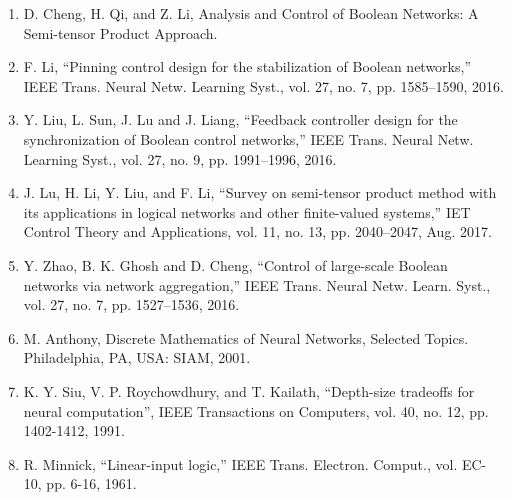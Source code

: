 \documentclass{article}
\begin{document}
\begin{enumerate}
	\item D. Cheng, H. Qi, and Z. Li, Analysis and Control of Boolean Networks: A Semi-tensor Product Approach.

	\item F. Li, “Pinning control design for the stabilization of Boolean networks,” IEEE Trans. Neural Netw. Learning Syst., vol. 27, no. 7, pp. 1585–1590, 2016.

	\item Y. Liu, L. Sun, J. Lu and J. Liang, “Feedback controller design for the synchronization of Boolean control networks,” IEEE Trans. Neural Netw. Learning Syst., vol. 27, no. 9, pp. 1991–1996, 2016.

	\item J. Lu, H. Li, Y. Liu, and F. Li, “Survey on semi-tensor product method with its applications
	in logical networks and other finite-valued systems,” IET Control Theory and Applications, vol.
	11, no. 13, pp. 2040–2047, Aug. 2017.

	\item Y. Zhao, B. K. Ghosh and D. Cheng, “Control of large-scale Boolean networks via network
	aggregation,” IEEE Trans. Neural Netw. Learn. Syst., vol. 27, no. 7, pp. 1527–1536, 2016.

	\item M. Anthony, Discrete Mathematics of Neural Networks, Selected Topics. Philadelphia, PA,
	USA: SIAM, 2001.

	\item K. Y. Siu, V. P. Roychowdhury, and T. Kailath, “Depth-size tradeoffs for neural computation”,
	IEEE Transactions on Computers, vol. 40, no. 12, pp. 1402-1412, 1991.

	\item R. Minnick, “Linear-input logic,” IEEE Trans. Electron. Comput., vol. EC-10, pp. 6-16, 1961.
\end{enumerate}
\end{document}
